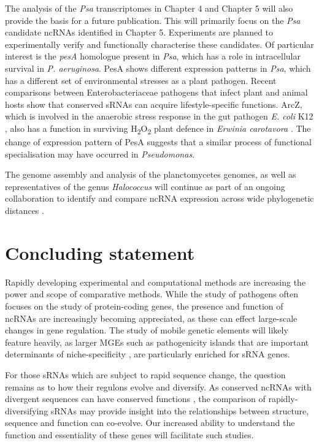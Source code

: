The analysis of the \textit{Psa} transcriptomes in Chapter 4 and Chapter 5 will also provide the basis for a future publication. This will primarily focus on the \textit{Psa} candidate ncRNAs identified in Chapter 5. Experiments are planned to experimentally verify and functionally characterise these candidates. Of particular interest is the \textit{pesA} homologue present in \textit{Psa}, which has a role in intracellular survival in \textit{P. aeruginosa}. PesA shows different expression patterns in \textit{Psa}, which has a different set of environmental stresses as a plant pathogen. Recent comparisons between Enterobacteriaceae pathogens that infect plant and animal hosts show that conserved sRNAs can acquire lifestyle-specific functions. ArcZ, which is involved in the anaerobic stress response in the gut pathogen \textit{E. coli} K12 \citep{Mandin2010-jf}, also has a function in surviving H\textsubscript{2}O\textsubscript{2} plant defence in \textit{Erwinia carotavora}
\citep{Schachterle2019-rq}. The change of expression pattern of PesA suggests that a similar process of functional specialisation may have occurred in \textit{Pseudomonas}.

The genome assembly and analysis of the planctomycetes genomes, as well as representatives of the genus \textit{Halococcus} will continue as part of an ongoing collaboration to identify and compare ncRNA expression across wide phylogenetic distances \citep{Lindgreen2014-rmv}.

\section{Concluding statement}

Rapidly developing experimental and computational methods are increasing the power and scope of comparative methods. While the study of pathogens often focuses on the study of protein-coding genes, the presence and function of ncRNAs are increasingly becoming appreciated, as these can effect large-scale changes in gene regulation. The study of mobile genetic elements will likely feature heavily, as larger MGEs such as pathogenicity islands that are important determinants of niche-specificity \citep{Melnyk2019-cclx}, are particularly enriched for sRNA genes.

For those sRNAs which are subject to rapid sequence change, the question remains as to how their regulons evolve and diversify. As conserved ncRNAs with divergent sequences can have conserved functions \citep{Horler2009-vava}, the comparison of rapidly-diversifying sRNAs may provide insight into the relationships between structure, sequence and function can co-evolve. Our increased ability to understand the function and essentiality of these genes will facilitate such studies.

